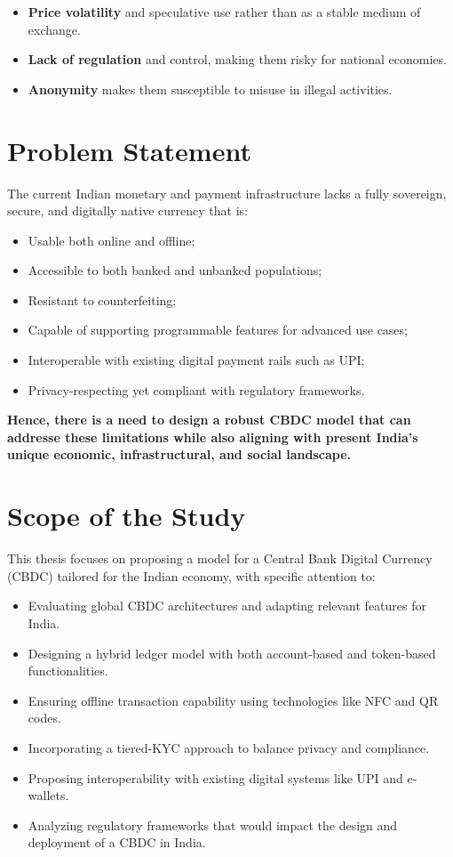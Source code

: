\begin{itemize}
    \item \textbf{Price volatility} and speculative use rather than as a stable medium of exchange.
    \item \textbf{Lack of regulation} and control, making them risky for national economies.
    \item \textbf{Anonymity} makes them susceptible to misuse in illegal activities.
\end{itemize}

\section{Problem Statement}
\label{chp3.statement}

The current Indian monetary and payment infrastructure lacks a fully sovereign, secure, and digitally native currency that is:

\begin{itemize}
    \item Usable both online and offline;
    \item Accessible to both banked and unbanked populations;
    \item Resistant to counterfeiting;
    \item Capable of supporting programmable features for advanced use cases;
    \item Interoperable with existing digital payment rails such as UPI;
    \item Privacy-respecting yet compliant with regulatory frameworks.
\end{itemize}

\textbf{Hence, there is a need to design a robust CBDC model that can addresse these limitations while also aligning with present India’s unique economic, infrastructural, and social landscape.}

\section{Scope of the Study}
\label{chp3.scope}

This thesis focuses on proposing a model for a Central Bank Digital Currency (CBDC) tailored for the Indian economy, with specific attention to:

\begin{itemize}
    \item Evaluating global CBDC architectures and adapting relevant features for India.
    \item Designing a hybrid ledger model with both account-based and token-based functionalities.
    \item Ensuring offline transaction capability using technologies like NFC and QR codes.
    \item Incorporating a tiered-KYC approach to balance privacy and compliance.
    \item Proposing interoperability with existing digital systems like UPI and e-wallets.
    \item Analyzing regulatory frameworks that would impact the design and deployment of a CBDC in India.
\end{itemize}

